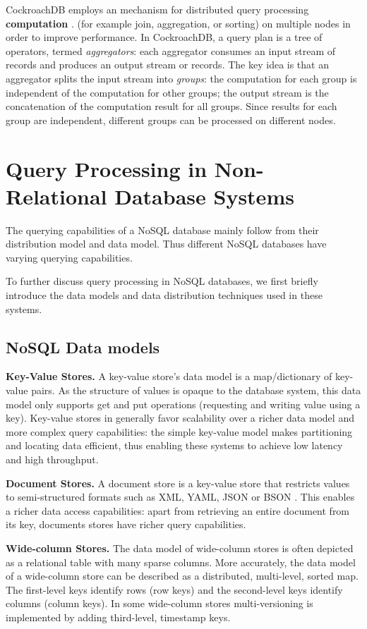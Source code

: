 CockroachDB employs an mechanism for distributed query processing \textbf{computation}
\cite{cockroachdb:distsql}.
(for example join, aggregation, or sorting) on multiple nodes in order to improve performance.
In CockroachDB, a query plan is a tree of operators, termed \textit{aggregators}:
each aggregator consumes an input stream of records and produces an output stream or records.
The key idea is that an aggregator splits the input stream into \textit{groups}:
the computation for each group is independent of the computation for other groups; the output stream is the concatenation
of the computation result for all groups.
Since results for each group are independent, different groups can be processed on different nodes.

\section{Query Processing in Non-Relational Database Systems}

The querying capabilities of a NoSQL database mainly follow from their distribution model and data model.
Thus different NoSQL databases have varying querying capabilities.

To further discuss query processing in NoSQL databases, we first briefly introduce the data models and data distribution
techniques used in these systems.

\subsection{NoSQL Data models}
\noindent
\textbf{Key-Value Stores.} A key-value store's data model is a map/dictionary of key-value pairs.
As the structure of values is opaque to the database system, this data model only supports get and put operations
(requesting and writing value using a key).
Key-value stores in generally favor scalability over a richer data model and more complex query capabilities:
the simple key-value model makes partitioning and locating data efficient, thus enabling these systems to achieve low
latency and high throughput.

\bigskip
\noindent
\textbf{Document Stores.} A document store is a key-value store that restricts values to semi-structured formats such as
XML, YAML, JSON or BSON \cite{bson:spec}.
This enables a richer data access capabilities: apart from retrieving an entire document from its key, documents stores
have richer query capabilities.

\bigskip
\noindent
\textbf{Wide-column Stores.} The data model of wide-column stores is often depicted as a relational table with many
sparse columns.
More accurately, the data model of a wide-column store can be described as a distributed, multi-level, sorted map.
The first-level keys identify rows (row keys) and the second-level keys identify columns (column keys).
In some wide-column stores multi-versioning is implemented by adding third-level, timestamp keys.

